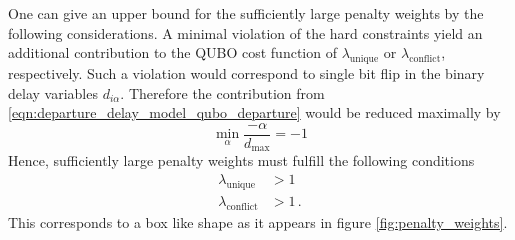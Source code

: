 One can give an upper bound for the sufficiently large penalty weights by the following considerations.
A minimal violation of the hard constraints yield an additional contribution to the QUBO cost function of $\lambda_\text{unique}$ or $\lambda_\text{conflict}$, respectively.
Such a violation would correspond to single bit flip in the binary delay variables $d_{i\alpha}$.
Therefore the contribution from \eqref{eqn:departure_delay_model_qubo_departure} would be reduced maximally by 
\begin{equation*}
    \min_\alpha \frac{-\alpha}{d_\text{max}} = - 1    
\end{equation*}
Hence, sufficiently large penalty weights must fulfill the following conditions
\begin{align*}
    \lambda_\text{unique} & > 1 \\
    \lambda_\text{conflict} &> 1 \, .
\end{align*}
This corresponds to a box like shape as it appears in figure \ref{fig:penalty_weights}.
